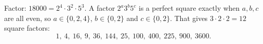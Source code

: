Factor: $18000=2^4\cdot3^2\cdot5^3$. A factor $2^a3^b5^c$ is a perfect square exactly when $a,b,c$ are all even, so $a\in\{0,2,4\}$, $b\in\{0,2\}$ and $c\in\{0,2\}$. That gives $3\cdot2\cdot2=\boxed{12}$ square factors:
\[
1,\ 4,\ 16,\ 9,\ 36,\ 144,\ 25,\ 100,\ 400,\ 225,\ 900,\ 3600 .
\]

